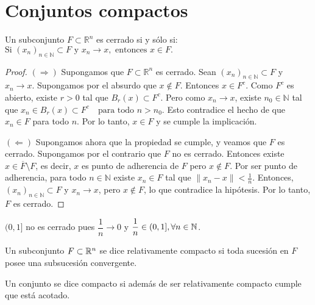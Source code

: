 \clearpage
\section{Conjuntos compactos}

\begin{theorem}
  Un subconjunto \(F \subset \mathbb{R}^n\) es cerrado si y sólo si:
  \(\text{Si } (x_n)_{n \in \mathbb{N}} \subset F \text{ y } x_n \to x, \text{ entonces } x \in F.\)
  \begin{proof}
    \((\Rightarrow)\) Supongamos que \(F \subset \mathbb{R}^n\) es cerrado.
    Sean \((x_n)_{n \in \mathbb{N}} \subset F\) y \(x_n \to x\).
    Supongamos por el absurdo que \(x \notin F\). Entonces \(x \in F^c\).
    Como \(F^c\) es abierto, existe \(r > 0\) tal que \(B_r(x) \subset F^c\).
    Pero como \(x_n \to x\), existe \(n_0 \in \mathbb{N}\) tal que
    \(x_n \in B_r(x) \subset F^c \quad \text{para todo } n > n_0.\)
    Esto contradice el hecho de que \(x_n \in F\) para todo \(n\).
    Por lo tanto, \(x \in F\) y se cumple la implicación.

    \medskip

    \((\Leftarrow)\) Supongamos ahora que la propiedad se cumple, y veamos que \(F\) es cerrado.
    Supongamos por el contrario que \(F\) no es cerrado. Entonces existe \(x \in \overline{F} \setminus F\),
    es decir, \(x\) es punto de adherencia de \(F\) pero \(x \notin F\).
    Por ser punto de adherencia, para todo \(n \in \mathbb{N}\) existe \(x_n \in F\) tal que
    \(\|x_n - x\| < \frac{1}{n}.\)
    Entonces, \((x_n)_{n \in \mathbb{N}} \subset F\) y \(x_n \to x\), pero \(x \notin F\),
    lo que contradice la hipótesis. Por lo tanto, \(F\) es cerrado.
  \end{proof}
\end{theorem}

\begin{eg}
  \((0, 1]\) no es cerrado pues \(\dfrac{1}{n} \to 0\) y \(\dfrac{1}{n} \in (0, 1], \forall n \in \mathbb{N}\).
\end{eg}

\begin{definition}
  Un subconjunto \(F \subset \mathbb{R}^n\) se dice relativamente compacto si toda sucesión en \(F\) posee una subsucesión convergente.
\end{definition}

\begin{definition}[Compacto]
  Un conjunto se dice compacto si además de ser relativamente compacto cumple que está acotado.
\end{definition}


